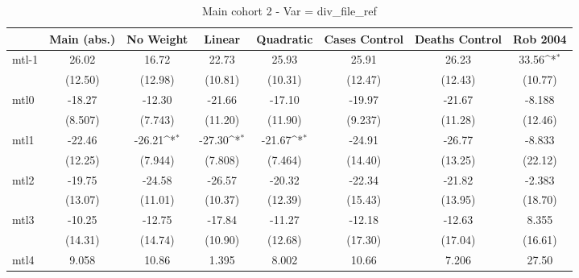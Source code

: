 \documentclass{article}
\begin{document}
{
\def\sym#1{\ifmmode^{#1}\else\(^{#1}\)\fi}
\begin{longtable}{l*{7}{c}}
\caption{Main cohort 2 - Var = div\_file\_ref}\\
\hline\hline\endfirsthead\hline\endhead\hline\endfoot\endlastfoot
                &\multicolumn{1}{c}{Main (abs.)}&\multicolumn{1}{c}{No Weight}&\multicolumn{1}{c}{Linear}&\multicolumn{1}{c}{Quadratic}&\multicolumn{1}{c}{Cases Control}&\multicolumn{1}{c}{Deaths Control}&\multicolumn{1}{c}{Rob 2004}\\
\hline
mtl-1           &    26.02         &    16.72         &    22.73         &    25.93         &    25.91         &    26.23         &    33.56\sym{*}  \\
                &  (12.50)         &  (12.98)         &  (10.81)         &  (10.31)         &  (12.47)         &  (12.43)         &  (10.77)         \\
mtl0            &   -18.27         &   -12.30         &   -21.66         &   -17.10         &   -19.97         &   -21.67         &   -8.188         \\
                &  (8.507)         &  (7.743)         &  (11.20)         &  (11.90)         &  (9.237)         &  (11.28)         &  (12.46)         \\
mtl1            &   -22.46         &   -26.21\sym{*}  &   -27.30\sym{*}  &   -21.67\sym{*}  &   -24.91         &   -26.77         &   -8.833         \\
                &  (12.25)         &  (7.944)         &  (7.808)         &  (7.464)         &  (14.40)         &  (13.25)         &  (22.12)         \\
mtl2            &   -19.75         &   -24.58         &   -26.57         &   -20.32         &   -22.34         &   -21.82         &   -2.383         \\
                &  (13.07)         &  (11.01)         &  (10.37)         &  (12.39)         &  (15.43)         &  (13.95)         &  (18.70)         \\
mtl3            &   -10.25         &   -12.75         &   -17.84         &   -11.27         &   -12.18         &   -12.63         &    8.355         \\
                &  (14.31)         &  (14.74)         &  (10.90)         &  (12.68)         &  (17.30)         &  (17.04)         &  (16.61)         \\
mtl4            &    9.058         &    10.86         &    1.395         &    8.002         &    10.66         &    7.206         &    27.50         \\

\end{longtable}}
\end{document}
